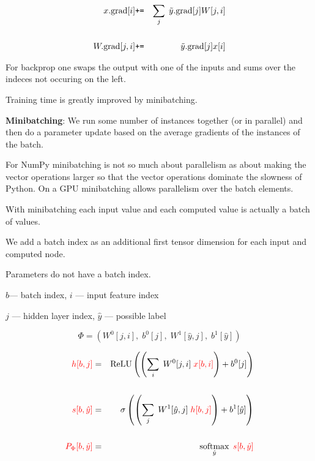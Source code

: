 {{\color{red} 
  \begin{eqnarray*}
  \\
  x.\mathrm{grad}[i] & \mbox{\tt +=} & \sum_j\;\tilde{y}.\mathrm{grad}[j]W[j,i] \\
  \\
  W.\mathrm{grad}[j,i] & \mbox{\tt +=} & \tilde{y}.\mathrm{grad}[j]x[i]
\end{eqnarray*}
}

For backprop one swaps the output with one of the inputs and sums over the indeces not occuring on the left.


Training time is greatly improved by minibatching.

 \vfill
{\bf Minibatching}: We run some number of instances together (or in parallel) and then do a parameter update based on the average
gradients of the instances of the batch.

\vfill
For NumPy minibatching is not so much about parallelism as about making the vector operations larger so that the vector operations dominate
the slowness of Python.  On a GPU minibatching allows parallelism over the batch elements.
\vfill

\vfill
With minibatching each input value and each computed value is actually a batch of values.

\vfill
We add a batch index as an additional first tensor dimension for each input and computed node.

\vfill
Parameters do not have a batch index.


\centerline{$b$--- batch index,\hspace{3em} $i$ --- input feature index}
\centerline{$j$ --- hidden layer index, \hspace{3em} $\hat{y}$ --- possible label}
$$\Phi = (W^0[j,i],\;b^0[j],\;W^1[\hat{y},j],\;b^1[\hat{y}])$$

\vfill
\begin{eqnarray*}
  {\color{red} h[b,j]} & = & \mathrm{ReLU}\left(\left(\sum_i\;W^0[j,i] \;{\color{red} x[b,i]}\right) + b^0[j]\right) \\
  \\
  {\color{red} s[b,\hat{y}]} & = & \sigma\left(\left(\sum_j\;W^1[\hat{y},j]\;{\color{red} h[b,j]}\right) + b^1[\hat{y}]\right) \\
  \\
  {\color{red} P_\Phi[b,\hat{y}]} & = & \operatorname*{softmax}_{\hat{y}}\;{\color{red} s[b,\hat{y}]}
\end{eqnarray*}

}
